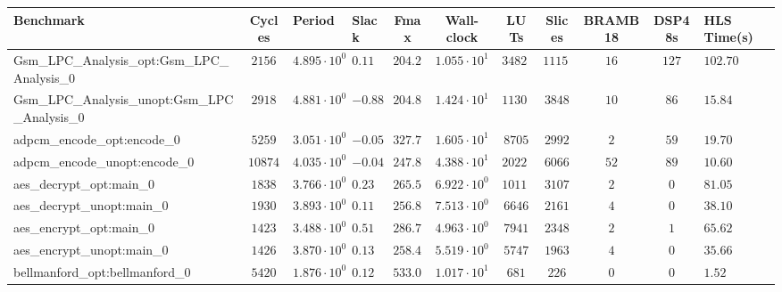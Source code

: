 \begin{tabular}{|l|c|HHc|c|c|c|c|cH|}
\hline
Benchmark                                       & Cycles       & Period                 & Slack     & Fmax       & Wall-clock              & LUTs       & Slices    & BRAMB18 & DSP48s  & HLS Time(s) \\
\hline
Gsm\_LPC\_Analysis\_opt:Gsm\_LPC\_Analysis\_0   & $ 2156     $ & $ 4.895 \cdot 10^{0} $ & $ 0.11  $ & $ 204.29 $ & $ 1.055 \cdot 10^{1}  $ & $ 34820  $ & $ 11151 $ & $ 16  $ & $ 127 $ & $ 102.70  $ \\
Gsm\_LPC\_Analysis\_unopt:Gsm\_LPC\_Analysis\_0 & $ 2918     $ & $ 4.881 \cdot 10^{0} $ & $ -0.88 $ & $ 204.88 $ & $ 1.424 \cdot 10^{1}  $ & $ 11305  $ & $ 3848  $ & $ 10  $ & $ 86  $ & $ 15.84   $ \\
adpcm\_encode\_opt:encode\_0                    & $ 5259     $ & $ 3.051 \cdot 10^{0} $ & $ -0.05 $ & $ 327.76 $ & $ 1.605 \cdot 10^{1}  $ & $ 8705   $ & $ 2992  $ & $ 2   $ & $ 59  $ & $ 19.70   $ \\
adpcm\_encode\_unopt:encode\_0                  & $ 10874    $ & $ 4.035 \cdot 10^{0} $ & $ -0.04 $ & $ 247.83 $ & $ 4.388 \cdot 10^{1}  $ & $ 20227  $ & $ 6066  $ & $ 52  $ & $ 89  $ & $ 10.60   $ \\
aes\_decrypt\_opt:main\_0                       & $ 1838     $ & $ 3.766 \cdot 10^{0} $ & $ 0.23  $ & $ 265.53 $ & $ 6.922 \cdot 10^{0}  $ & $ 10118  $ & $ 3107  $ & $ 2   $ & $ 0   $ & $ 81.05   $ \\
aes\_decrypt\_unopt:main\_0                     & $ 1930     $ & $ 3.893 \cdot 10^{0} $ & $ 0.11  $ & $ 256.87 $ & $ 7.513 \cdot 10^{0}  $ & $ 6646   $ & $ 2161  $ & $ 4   $ & $ 0   $ & $ 38.10   $ \\
aes\_encrypt\_opt:main\_0                       & $ 1423     $ & $ 3.488 \cdot 10^{0} $ & $ 0.51  $ & $ 286.70 $ & $ 4.963 \cdot 10^{0}  $ & $ 7941   $ & $ 2348  $ & $ 2   $ & $ 1   $ & $ 65.62   $ \\
aes\_encrypt\_unopt:main\_0                     & $ 1426     $ & $ 3.870 \cdot 10^{0} $ & $ 0.13  $ & $ 258.40 $ & $ 5.519 \cdot 10^{0}  $ & $ 5747   $ & $ 1963  $ & $ 4   $ & $ 0   $ & $ 35.66   $ \\
bellmanford\_opt:bellmanford\_0                 & $ 5420     $ & $ 1.876 \cdot 10^{0} $ & $ 0.12  $ & $ 533.05 $ & $ 1.017 \cdot 10^{1}  $ & $ 681    $ & $ 226   $ & $ 0   $ & $ 0   $ & $ 1.52    $ \\

\end{tabular}
